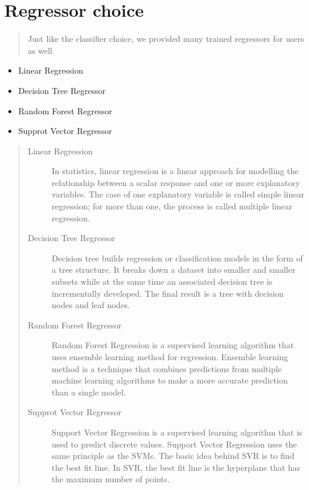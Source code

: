 \documentclass[letterpaper,10pt,english]{sphinxmanual}
\begin{document}
\chapter{Regressor choice}
\label{\detokenize{index:regressor-choice}}\begin{quote}\begin{description}
\item[{Just like the classifier choice, we provided many trained regressors for users as well}] \leavevmode
\end{description}\end{quote}
\begin{itemize}
\item {} 
\sphinxAtStartPar
Linear Regression

\item {} 
\sphinxAtStartPar
Decision Tree Regressor

\item {} 
\sphinxAtStartPar
Random Forest Regressor

\item {} 
\sphinxAtStartPar
Supprot Vector Regressor

\end{itemize}
\begin{quote}\begin{description}
\item[{Linear Regression}] \leavevmode
\sphinxAtStartPar
In statistics, linear regression is a linear approach for modelling the relationship between a scalar response and one or more explanatory variables. The case of one explanatory variable is called simple linear regression; for more than one, the process is called multiple linear regression.

\item[{Decision Tree Regressor}] \leavevmode
\sphinxAtStartPar
Decision tree builds regression or classification models in the form of a tree structure. It breaks down a dataset into smaller and smaller subsets while at the same time an associated decision tree is incrementally developed. The final result is a tree with decision nodes and leaf nodes.

\item[{Random Forest Regressor}] \leavevmode
\sphinxAtStartPar
Random Forest Regression is a supervised learning algorithm that uses ensemble learning method for regression. Ensemble learning method is a technique that combines predictions from multiple machine learning algorithms to make a more accurate prediction than a single model.

\item[{Supprot Vector Regressor}] \leavevmode
\sphinxAtStartPar
Support Vector Regression is a supervised learning algorithm that is used to predict discrete values. Support Vector Regression uses the same principle as the SVMs. The basic idea behind SVR is to find the best fit line. In SVR, the best fit line is the hyperplane that has the maximum number of points.

\end{description}\end{quote}
\end{document}
